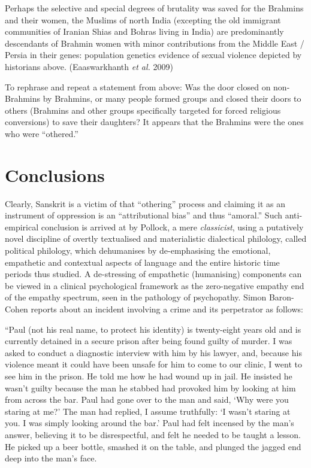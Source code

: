 Perhaps the selective and special degrees of brutality was saved for the Brahmins and their women, the Muslims of north India (excepting the old immigrant communities of Iranian Shias and Bohras living in India) are predominantly descendants of Brahmin women with minor contributions from the Middle East / Persia in their genes: population genetics evidence of sexual violence depicted by historians above. (Eaaswarkhanth \textit{et al.} 2009)

To rephrase and repeat a statement from above: Was the door closed on non-Brahmins by Brahmins, or many people formed groups and closed their doors to others (Brahmins and other groups specifically targeted for forced religious conversions) to save their daughters? It appears that the Brahmins were the ones who were “othered.”

\vspace{-.3cm}

\section*{Conclusions}

Clearly, Sanskrit is a victim of that “othering” process and claiming it as an instrument of oppression is an “attributional bias” and thus “amoral.” Such anti-empirical conclusion is arrived at by Pollock, a mere \textit{classicist}, using a putatively novel discipline of overtly textualised and materialistic dialectical philology, called political philology, which dehumanises by de-emphasising the emotional, empathetic and contextual aspects of language and the entire historic time periods thus studied. A de-stressing of empathetic (humanising) components can be viewed in a clinical psychological framework as the zero-negative empathy end of the empathy spectrum, seen in the pathology of psychopathy. Simon Baron-Cohen reports about an incident involving a crime and its perpetrator as follows:

\begin{myquote}
“Paul (not his real name, to protect his identity) is twenty-eight years old and is currently detained in a secure prison after being found guilty of murder. I was asked to conduct a diagnostic interview with him by his lawyer, and, because his violence meant it could have been unsafe for him to come to our clinic, I went to see him in the prison. He told me how he had wound up in jail. He insisted he wasn’t guilty because the man he stabbed had provoked him by looking at him from across the bar. Paul had gone over to the man and said, ‘Why were you staring at me?’ The man had replied, I assume truthfully: ‘I wasn’t staring at you. I was simply looking around the bar.’ Paul had felt incensed by the man’s answer, believing it to be disrespectful, and felt he needed to be taught a lesson. He picked up a beer bottle, smashed it on the table, and plunged the jagged end deep into the man’s face.
\end{myquote}

